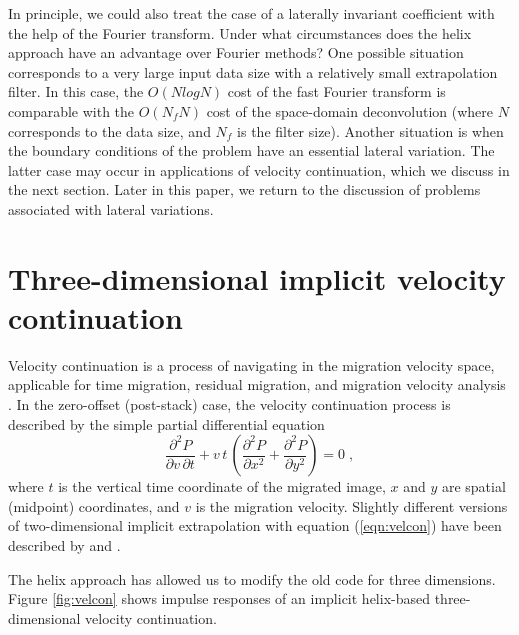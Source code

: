 \par
In principle, we could also treat the case of a laterally invariant
coefficient with the help of the Fourier transform. Under what
circumstances does the helix approach have an advantage over Fourier
methods? One possible situation corresponds to a very large input data
size with a relatively small extrapolation filter. In this case, the
$O(N log N)$ cost of the fast Fourier transform is comparable with the
$O(N_f N)$ cost of the space-domain deconvolution (where $N$
corresponds to the data size, and $N_f$ is the filter size). Another
situation is when the boundary conditions of the problem have an
essential lateral variation. The latter case may occur in applications
of velocity continuation, which we discuss in the next section.  Later
in this paper, we return to the discussion of problems associated with
lateral variations.

\section{Three-dimensional implicit velocity continuation}

Velocity continuation is a process of navigating in the migration
velocity space, applicable for time migration, residual migration, and
migration velocity analysis \cite{Fomel.sep.92.159}. In the
zero-offset (post-stack) case, the velocity continuation process is
described by the simple partial differential equation
\cite{Claerbout.sep.48.79,me}
\begin{equation}
  \label{eqn:velcon}
  \frac{\partial^2 P}{\partial v\,\partial t} +
  v\,t\,\left(\frac{\partial^2 P}{\partial x^2} + \frac{\partial^2
      P}{\partial y^2}\right) = 0\;,
\end{equation}
where $t$ is the vertical time coordinate of the migrated image, $x$
and $y$ are spatial (midpoint) coordinates, and $v$ is the migration
velocity. Slightly different versions of two-dimensional implicit
extrapolation with equation (\ref{eqn:velcon}) have been described by
 and \cite{Fomel.sep.92.159}. 

\par
The helix approach has allowed us to modify the old code for three
dimensions. Figure \ref{fig:velcon} shows impulse responses of an
implicit helix-based three-dimensional velocity continuation.


